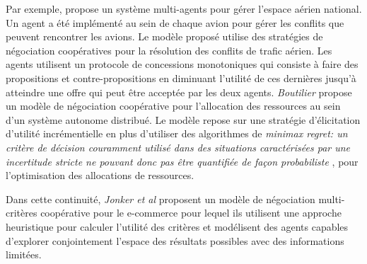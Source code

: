 		Par exemple, \cite{wollkind2004automated} propose un système multi-agents pour gérer l'espace aérien national. Un agent a été implémenté au sein de chaque avion pour gérer les conflits que peuvent rencontrer les avions. Le modèle proposé utilise des stratégies de négociation coopératives pour la résolution des conflits de trafic aérien. Les agents utilisent un protocole de concessions monotoniques \cite{zlotkin1989negotiation} qui consiste à faire des propositions et contre-propositions en diminuant l'utilité de ces dernières jusqu'à atteindre une offre qui peut être acceptée par les deux agents. 
		 \emph{Boutilier} \cite{boutilier2002cooperative} propose un modèle de négociation coopérative pour l'allocation des ressources au sein d'un système autonome distribué. Le modèle repose sur une stratégie d'élicitation d'utilité incrémentielle en plus d'utiliser des algorithmes de \textit{minimax regret: un critère de décision couramment utilisé dans des situations caractérisées par une incertitude stricte ne pouvant donc pas être quantifiée de façon probabiliste} \cite{borodin2005online}, pour l'optimisation des allocations de ressources.   
	
		Dans cette continuité, \emph{Jonker et al} \cite{jonker2007agent} proposent un modèle de négociation multi-critères coopérative pour le e-commerce pour lequel ils utilisent une approche heuristique pour calculer l'utilité des critères et modélisent des agents capables d'explorer conjointement l'espace des résultats possibles avec des informations limitées. 
	

